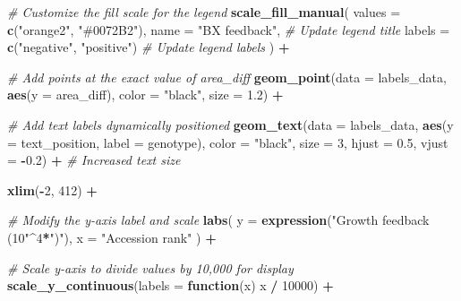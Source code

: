 \documentclass[
  11pt,
]{article}
\newenvironment{Shaded}{\begin{snugshade}}{\end{snugshade}}
\newcommand{\AttributeTok}[1]{\textcolor[rgb]{0.13,0.29,0.53}{#1}}
\newcommand{\CommentTok}[1]{\textcolor[rgb]{0.56,0.35,0.01}{\textit{#1}}}
\newcommand{\ControlFlowTok}[1]{\textcolor[rgb]{0.13,0.29,0.53}{\textbf{#1}}}
\newcommand{\DecValTok}[1]{\textcolor[rgb]{0.00,0.00,0.81}{#1}}
\newcommand{\FloatTok}[1]{\textcolor[rgb]{0.00,0.00,0.81}{#1}}
\newcommand{\FunctionTok}[1]{\textcolor[rgb]{0.13,0.29,0.53}{\textbf{#1}}}
\newcommand{\NormalTok}[1]{#1}
\newcommand{\SpecialCharTok}[1]{\textcolor[rgb]{0.81,0.36,0.00}{\textbf{#1}}}
\newcommand{\StringTok}[1]{\textcolor[rgb]{0.31,0.60,0.02}{#1}}
\begin{document}
\begin{Shaded}
\begin{Highlighting}[]
  \CommentTok{\# Customize the fill scale for the legend}
  \FunctionTok{scale\_fill\_manual}\NormalTok{(}
    \AttributeTok{values =} \FunctionTok{c}\NormalTok{(}\StringTok{"orange2"}\NormalTok{, }\StringTok{"\#0072B2"}\NormalTok{),}
    \AttributeTok{name =} \StringTok{"BX feedback"}\NormalTok{,  }\CommentTok{\# Update legend title}
    \AttributeTok{labels =} \FunctionTok{c}\NormalTok{(}\StringTok{"negative"}\NormalTok{, }\StringTok{"positive"}\NormalTok{)  }\CommentTok{\# Update legend labels}
\NormalTok{  ) }\SpecialCharTok{+}
  
  \CommentTok{\# Add points at the exact value of area\_diff}
  \FunctionTok{geom\_point}\NormalTok{(}\AttributeTok{data =}\NormalTok{ labels\_data,}
             \FunctionTok{aes}\NormalTok{(}\AttributeTok{y =}\NormalTok{ area\_diff), }
             \AttributeTok{color =} \StringTok{"black"}\NormalTok{, }\AttributeTok{size =} \FloatTok{1.2}\NormalTok{) }\SpecialCharTok{+}
  
  \CommentTok{\# Add text labels dynamically positioned}
  \FunctionTok{geom\_text}\NormalTok{(}\AttributeTok{data =}\NormalTok{ labels\_data,}
            \FunctionTok{aes}\NormalTok{(}\AttributeTok{y =}\NormalTok{ text\_position, }\AttributeTok{label =}\NormalTok{ genotype), }
            \AttributeTok{color =} \StringTok{"black"}\NormalTok{, }\AttributeTok{size =} \DecValTok{3}\NormalTok{, }\AttributeTok{hjust =} \FloatTok{0.5}\NormalTok{, }\AttributeTok{vjust =} \SpecialCharTok{{-}}\FloatTok{0.2}\NormalTok{) }\SpecialCharTok{+}  \CommentTok{\# Increased text size}
  
  \FunctionTok{xlim}\NormalTok{(}\SpecialCharTok{{-}}\DecValTok{2}\NormalTok{, }\DecValTok{412}\NormalTok{) }\SpecialCharTok{+}
  
  \CommentTok{\# Modify the y{-}axis label and scale}
  \FunctionTok{labs}\NormalTok{(}
    \AttributeTok{y =} \FunctionTok{expression}\NormalTok{(}\StringTok{"Growth feedback (10"}\SpecialCharTok{\^{}}\DecValTok{4}\SpecialCharTok{*}\StringTok{")"}\NormalTok{), }
    \AttributeTok{x =} \StringTok{"Accession rank"}
\NormalTok{  ) }\SpecialCharTok{+}
  
  \CommentTok{\# Scale y{-}axis to divide values by 10,000 for display}
  \FunctionTok{scale\_y\_continuous}\NormalTok{(}\AttributeTok{labels =} \ControlFlowTok{function}\NormalTok{(x) x }\SpecialCharTok{/} \DecValTok{10000}\NormalTok{) }\SpecialCharTok{+}
  

\end{Highlighting}
\end{Shaded}
\end{document}

